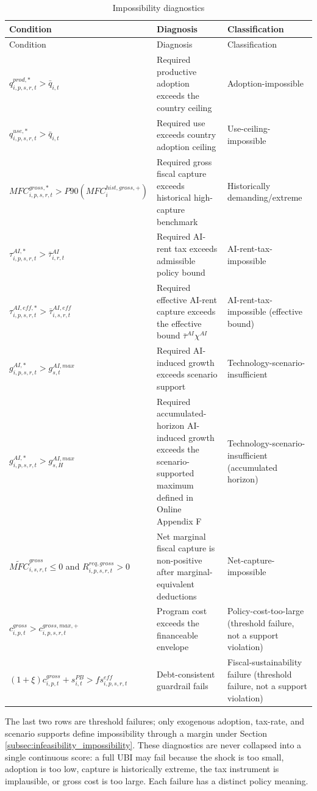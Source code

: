 \documentclass[11pt,a4paper]{article}
\begin{document}
\begin{longtable}{p{}p{}p{}}
\caption{Impossibility diagnostics}\label{tab:impossibility_diagnostics_v10}\\
\toprule
Condition & Diagnosis & Classification \\
\midrule
\endfirsthead
\toprule
Condition & Diagnosis & Classification \\
\midrule
\endhead
$q^{prod,*}_{i,p,s,r,t}>\bar q_{i,t}$ & Required productive adoption exceeds the country ceiling & Adoption-impossible \\
$q^{use,*}_{i,p,s,r,t}>\bar q_{i,t}$ & Required use exceeds country adoption ceiling & Use-ceiling-impossible \\
$MFC^{gross,*}_{i,p,s,r,t}>P90(MFC^{hist,gross,+}_i)$ & Required gross fiscal capture exceeds historical high-capture benchmark & Historically demanding/extreme \\
$\tau^{AI,*}_{i,p,s,r,t}>\bar\tau^{AI}_{i,r,t}$ & Required AI-rent tax exceeds admissible policy bound & AI-rent-tax-impossible \\
$\tau^{AI,eff,*}_{i,p,s,r,t}>\bar\tau^{AI,eff}_{i,s,r,t}$ & Required effective AI-rent capture exceeds the effective bound $\bar\tau^{AI}\chi^{AI}$ & AI-rent-tax-impossible (effective bound) \\
$g^{AI,*}_{i,p,s,r,t}>g^{AI,max}_{s,t}$ & Required AI-induced growth exceeds scenario support & Technology-scenario-insufficient \\
$g^{AI,*}_{i,p,s,r,t}>g^{AI,max}_{s,H}$ & Required accumulated-horizon AI-induced growth exceeds the scenario-supported maximum defined in Online Appendix F & Technology-scenario-insufficient (accumulated horizon) \\
$\widetilde{MFC}^{gross}_{i,s,r,t}\leq0$ and $R^{req,gross}_{i,p,s,r,t}>0$ & Net marginal fiscal capture is non-positive after marginal-equivalent deductions & Net-capture-impossible \\
$c^{gross}_{i,p,t}>c^{gross,max,+}_{i,p,s,r,t}$ & Program cost exceeds the financeable envelope & Policy-cost-too-large (threshold failure, not a support violation) \\
$(1+\xi)c^{gross}_{i,p,t}+s^{PB}_{i,t}>fs^{eff}_{i,p,s,r,t}$ & Debt-consistent guardrail fails & Fiscal-sustainability failure (threshold failure, not a support violation) \\
\bottomrule
\end{longtable}

The last two rows are threshold failures; only exogenous adoption, tax-rate, and scenario supports define impossibility through a margin under Section \ref{subsec:infeasibility_impossibility}. These diagnostics are never collapsed into a single continuous score: a full UBI may fail because the shock is too small, adoption is too low, capture is historically extreme, the tax instrument is implausible, or gross cost is too large. Each failure has a distinct policy meaning.
\end{document}
